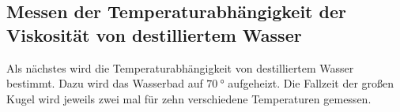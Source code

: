 \subsection{Messen der Temperaturabhängigkeit der Viskosität von destilliertem Wasser}
Als nächstes wird die Temperaturabhängigkeit von destilliertem Wasser bestimmt. 
Dazu wird das Wasserbad auf $\SI{70}{\degree}$ aufgeheizt. Die Fallzeit der großen Kugel wird jeweils zwei mal 
für zehn verschiedene Temperaturen gemessen.